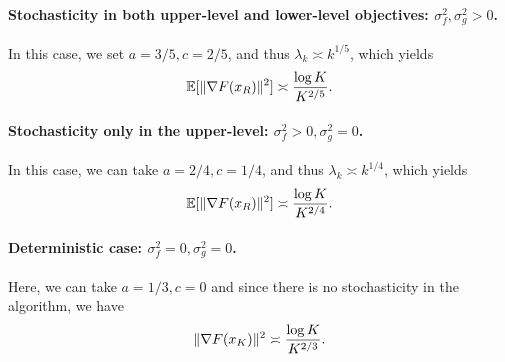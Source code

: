 \paragraph{Stochasticity in both upper-level and lower-level objectives: $\sigma_f^2, \sigma_g^2 > 0$.} In this case, we set $a = 3/5, c = 2/5$, and thus $\lambda_k \asymp k^{1/5}$, which yields
\begin{align*}
    \mathbb{E}[\|\nabla F(x_R)\|^2] \asymp \frac{\log K}{K^{2/5}}.
\end{align*}





\paragraph{Stochasticity only in the upper-level: $\sigma_f^2 > 0, \sigma_g^2 = 0$.}
In this case, we can take $a = 2/4, c = 1/4$, and thus $\lambda_k \asymp k^{1/4}$, which yields
\begin{align*}
    \mathbb{E}[\|\nabla F(x_R)\|^2] \asymp \frac{\log K}{K^{2/4}}.
\end{align*}


\paragraph{Deterministic case: $\sigma_f^2 = 0, \sigma_g^2 = 0$.}
Here, we can take $a = 1/3, c = 0$ and since there is no stochasticity in the algorithm, we have
\begin{align*}
    \|\nabla F(x_K)\|^2 \asymp \frac{\log K}{K^{2/3}}.
\end{align*}



